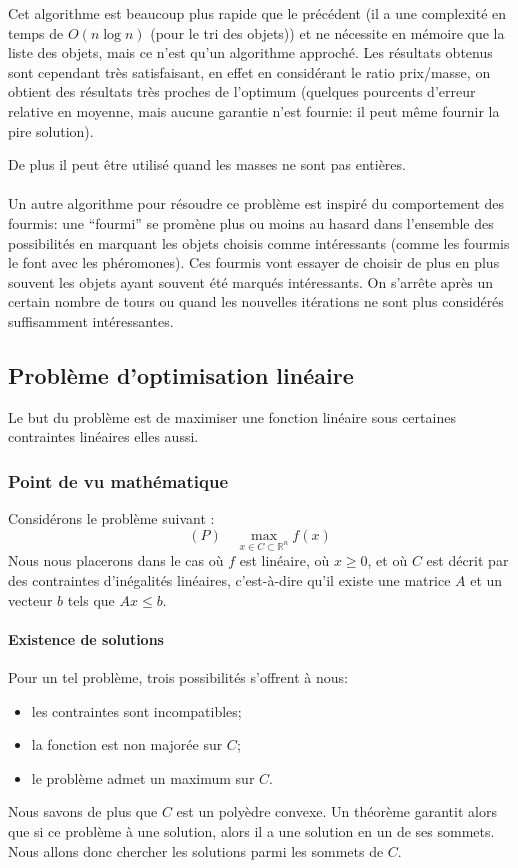     Cet algorithme est beaucoup plus rapide que le précédent (il a une
    complexité en temps de $O(n \log n)$ (pour le tri des objets)) et ne
    nécessite en mémoire que la liste des objets, mais ce n'est qu'un algorithme
    approché. Les résultats obtenus sont cependant très satisfaisant, en effet
    en considérant le ratio \nobreak prix/masse, on obtient des résultats très
    proches de l'optimum (quelques pourcents d'erreur relative en moyenne, mais
    aucune garantie n'est fournie: il peut même fournir la pire solution).

    De plus il peut être utilisé quand les masses ne sont pas entières.

    \paragraph{}
    Un autre algorithme pour résoudre ce problème est inspiré du comportement
    des fourmis: une ``fourmi'' se promène plus ou moins au hasard dans
    l'ensemble des possibilités en marquant les objets choisis comme
    intéressants (comme les fourmis le font avec les phéromones). Ces fourmis
    vont essayer de choisir de plus en plus souvent les objets ayant souvent
    été marqués intéressants. On s'arrête après un certain nombre de tours ou
    quand les nouvelles itérations ne sont plus considérés suffisamment
    intéressantes.

\subsection{Problème d'optimisation linéaire}
  Le but du problème est de maximiser une fonction linéaire sous certaines
  contraintes linéaires elles aussi.

  \subsubsection{Point de vu mathématique} %
      Considérons le problème suivant :
      $$ (P) \quad \max_{x\in C \subset \mathbb{R}^n} f(x)$$
      Nous nous placerons dans le cas où $f$ est linéaire, où $x \geqslant 0$,
      et où $C$ est décrit par des contraintes d'inégalités linéaires,
      c'est-à-dire qu'il existe une matrice $A$ et un vecteur $b$ tels
      que $Ax\leqslant b$.

    \paragraph{Existence de solutions}
      Pour un tel problème, trois possibilités s'offrent à nous:
      \begin{itemize}
        \item les contraintes sont incompatibles;
        \item la fonction est non majorée sur $C$;
        \item le problème admet un maximum sur $C$.
      \end{itemize}
      Nous savons de plus que $C$ est un polyèdre convexe. Un théorème garantit
      alors que si ce problème à une solution, alors il a une solution en un de
      ses sommets. Nous allons donc chercher les solutions parmi les sommets de
      $C$.

